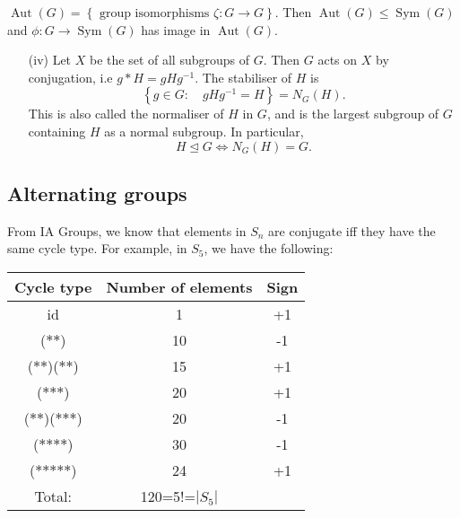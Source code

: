 \documentclass[a4paper]{scrartcl}
\begin{document}
\begin{definition*}[Automorphism]
      $\operatorname{Aut}(G)=\left\{\text{ group isomorphisms } \zeta: G \rightarrow G\right\}$. Then $\operatorname{Aut}(G)\leq \operatorname{Sym}(G)$ and $\phi: G \rightarrow \operatorname{Sym}(G)$ has image in $\operatorname{Aut}(G).$ 
\end{definition*}
\begin{itemize}
     \item[(iv)] Let $X$ be the set of all subgroups of $G$. Then $G$ acts on $X$ by conjugation, i.e $g \ast H=gH {g}^{-1}$. The stabiliser of $H$ is \[
     \left\{g \in G: \quad g H {g}^{-1}=H\right\}=N_{G}(H)
     .\] This is also called the normaliser of $H$ in $G$, and is the largest subgroup of $G$ containing $H$ as a normal subgroup. In particular, \[
     H \unlhd G \iff N_{G}(H) =G
     .\] 
\end{itemize}
\subsection{Alternating groups}
From IA Groups, we know that elements in $S_{n}$ are conjugate iff they have the same cycle type. For example, in $S_5$, we have the following:
\begin{center}
\begin{tabular}{|c|c|c|}
     \hline
     Cycle type & Number of elements & Sign\\
     \hline
     id &1&+1\\
     ($\ast$$\ast$)&10&-1\\
     ($\ast$$\ast$)($\ast$$\ast$)&15&+1\\
     ($\ast$$\ast$$\ast$)& 20&+1\\
     ($\ast$$\ast$)($\ast$$\ast$$\ast$) & 20&-1\\
     ($\ast$$\ast$$\ast$$\ast$) & 30&-1\\
     ($\ast$$\ast$$\ast$$\ast$$\ast$) & 24&+1\\
     \hline
     Total:& 120=5!=$|S_5 |$&\\
     \hline
\end{tabular}
\end{center}
\end{document}
